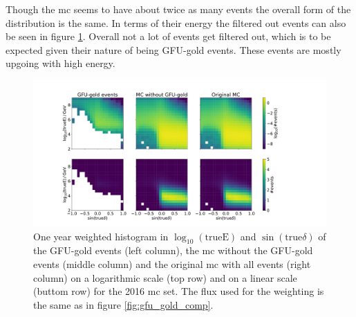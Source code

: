Though the mc seems to have about twice as many events the overall form of the distribution is the same.
In terms of their energy the filtered out events can also be seen in figure \ref{fig:energy}.
Overall not a lot of events get filtered out, which is to be expected given their nature of being GFU-gold events.
These events are mostly upgoing with high energy.
\begin{figure}
    \centering
    \includegraphics[width=16cm]{Plots/03_data/cleaned_mc_energy_test.pdf}
    \caption{One year weighted histogram in $\log_{10}(\text{trueE})$ and $\sin{(\text{true}\delta)}$ of the GFU-gold events (left column), the mc without the GFU-gold events (middle column) and the original mc with all events (right column) on a logarithmic scale (top row) and on a linear scale (buttom row) for the 2016 mc set. The flux used for the weighting is the same as in figure \ref{fig:gfu_gold_comp}.}
    \label{fig:energy}
\end{figure}
